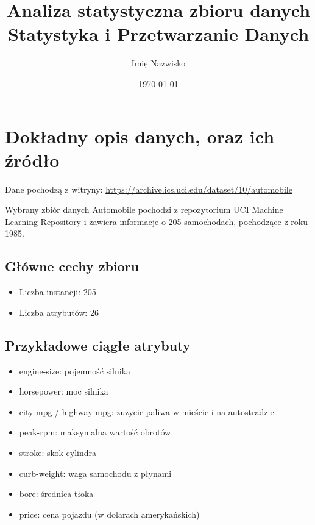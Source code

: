 \documentclass[12pt,a4paper]{article}
\title{Analiza statystyczna zbioru danych \\ \large{Statystyka i Przetwarzanie Danych}}
\author{Imię Nazwisko}
\date{\today}
\begin{document}
\maketitle
\tableofcontents
\newpage

\section{Dokładny opis danych, oraz ich źródło}

Dane pochodzą z witryny: \url{https://archive.ics.uci.edu/dataset/10/automobile}

Wybrany zbiór danych Automobile pochodzi z repozytorium UCI Machine Learning Repository i zawiera informacje o 205 samochodach, pochodzące z roku 1985.

\subsection{Główne cechy zbioru}
\begin{itemize}
    \item Liczba instancji: 205
    \item Liczba atrybutów: 26
\end{itemize}

\subsection{Przykładowe ciągłe atrybuty}
\begin{itemize}
    \item engine-size: pojemność silnika
    \item horsepower: moc silnika
    \item city-mpg / highway-mpg: zużycie paliwa w mieście i na autostradzie
    \item peak-rpm: maksymalna wartość obrotów
    \item stroke: skok cylindra
    \item curb-weight: waga samochodu z płynami
    \item bore: średnica tłoka
    \item price: cena pojazdu (w dolarach amerykańskich)
\end{itemize}
\end{document}
